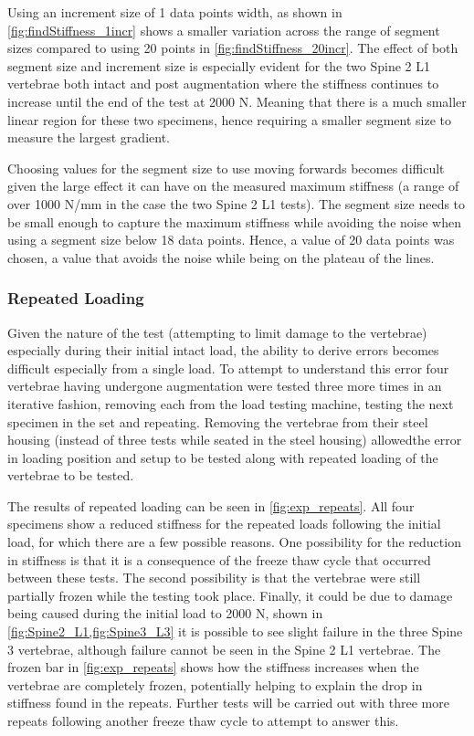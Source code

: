 Using an increment size of 1 data points width, as shown in
\cref{fig:findStiffness_1incr} shows a smaller variation across the range of
segment sizes compared to using 20 points in \cref{fig:findStiffness_20incr}.
The effect of both segment size and increment
size is especially evident for the two Spine 2 L1 vertebrae both intact and
post
augmentation where the stiffness continues to increase until the end of the
test
at 2000 N. Meaning that there is a much smaller linear region for these two
specimens, hence requiring a smaller segment size to measure the largest
gradient.

Choosing values for the segment size to use moving forwards becomes difficult
given the large effect it can have on the measured maximum stiffness (a range
of
over 1000 N/mm in the case the two Spine 2 L1 tests). The segment size needs to
be small enough to capture the maximum stiffness while avoiding the noise when
using a segment size below 18 data points. Hence, a value of 20 data points was
chosen, a value that avoids the noise while being on the plateau of the lines.


\subsubsection{Repeated Loading}

Given the nature of the test (attempting to limit damage to the vertebrae)
especially during their initial intact load, the ability to derive errors
becomes difficult especially from a single load. To attempt to understand this
error four vertebrae having undergone augmentation were tested three more times
in an iterative fashion, removing each from the load testing machine, testing
the next specimen in the set and repeating. Removing the vertebrae from their
steel housing (instead of three tests while seated in the steel housing)
allowedthe error in loading position and setup to be tested along with repeated
loading of the vertebrae to be tested.

The results of repeated loading can be seen in \cref{fig:exp_repeats}. All
four specimens show a reduced stiffness for the repeated loads following the
initial load, for which there are a few possible reasons. One possibility for
the reduction in stiffness is that it is a consequence of the freeze thaw cycle
that occurred between these tests. The second possibility is that the vertebrae
were still partially frozen while the testing took place. Finally, it could be
due to damage being caused during the initial load to 2000 N, shown in
\cref{fig:Spine2_L1,fig:Spine3_L3} it is possible to see slight failure
in the three Spine 3 vertebrae, although failure cannot be seen in the Spine 2
L1 vertebrae. The frozen bar in \cref{fig:exp_repeats} shows how the
stiffness increases when the vertebrae are completely frozen, potentially
helping to explain the drop in stiffness found in the repeats. Further tests
will be carried out with three more repeats following another freeze thaw cycle
to attempt to answer this.

